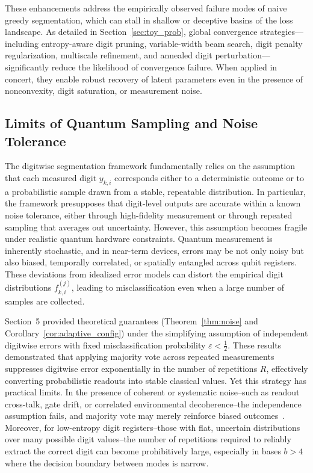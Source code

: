 \documentclass[aps,twocolumn,superscriptaddress,nofootinbib]{revtex4}
\begin{document}
These enhancements address the empirically observed failure modes of naive greedy segmentation, which can stall in shallow or deceptive basins of the loss landscape. As detailed in Section~\ref{sec:toy_prob}, global convergence strategies---including entropy-aware digit pruning, variable-width beam search, digit penalty regularization, multiscale refinement, and annealed digit perturbation---significantly reduce the likelihood of convergence failure. When applied in concert, they enable robust recovery of latent parameters even in the presence of nonconvexity, digit saturation, or measurement noise.
\subsection{Limits of Quantum Sampling and Noise Tolerance}
The digitwise segmentation framework fundamentally relies on the assumption that each measured digit \( y_{k,i} \) corresponds either to a deterministic outcome or to a probabilistic sample drawn from a stable, repeatable distribution. In particular, the framework presupposes that digit-level outputs are accurate within a known noise tolerance, either through high-fidelity measurement or through repeated sampling that averages out uncertainty. However, this assumption becomes fragile under realistic quantum hardware constraints. Quantum measurement is inherently stochastic, and in near-term devices, errors may be not only noisy but also biased, temporally correlated, or spatially entangled across qubit registers. These deviations from idealized error models can distort the empirical digit distributions \( f^{(j)}_{k,i} \), leading to misclassification even when a large number of samples are collected.

Section~5 provided theoretical guarantees (Theorem~\ref{thm:noise} and Corollary~\ref{cor:adaptive_config}) under the simplifying assumption of independent digitwise errors with fixed misclassification probability \( \varepsilon < \frac{1}{2} \). These results demonstrated that applying majority vote across repeated measurements suppresses digitwise error exponentially in the number of repetitions \( R \), effectively converting probabilistic readouts into stable classical values. Yet this strategy has practical limits. In the presence of coherent or systematic noise--such as readout cross-talk, gate drift, or correlated environmental decoherence--the independence assumption fails, and majority vote may merely reinforce biased outcomes~\cite{geller2020rigorous}. Moreover, for low-entropy digit registers--those with flat, uncertain distributions over many possible digit values--the number of repetitions required to reliably extract the correct digit can become prohibitively large, especially in bases \( b > 4 \) where the decision boundary between modes is narrow.
\end{document}
